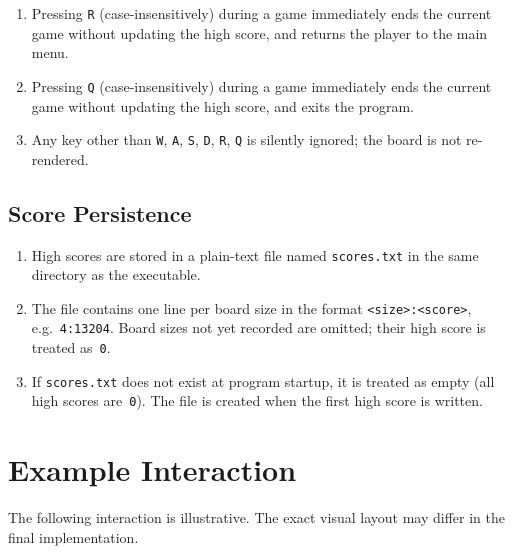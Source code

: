\documentclass{article} %
\newenvironment{myNote}{
        \begin{mdframed}[
                        style=defaultStyle,
                        linecolor=plGray,
                        backgroundcolor=plGray!8,
                        innertopmargin=7pt,
                        frametitle={\textbf{\color{plGray}Note}}
                ]
                \setlength{\parindent}{0pt}
                \setlength{\parskip}{5pt}
                }{
        \end{mdframed}
}
\begin{document}
\begin{enumerate}[resume]

	\item Pressing \texttt{R} (case-insensitively) during a game immediately ends the current game
	      without updating the high score, and returns the player to the main menu.

	\item Pressing \texttt{Q} (case-insensitively) during a game immediately ends the current game
	      without updating the high score, and exits the program.

	\item Any key other than \texttt{W}, \texttt{A}, \texttt{S}, \texttt{D}, \texttt{R}, \texttt{Q}
	      is silently ignored; the board is not re-rendered.

\end{enumerate}

\subsection{Score Persistence}

\begin{enumerate}[resume, label=\textbf{R\arabic*.}, leftmargin=*, itemsep=4pt]

	\item High scores are stored in a plain-text file named \texttt{scores.txt} in the same
	      directory as the executable.

	\item The file contains one line per board size in the format \texttt{<size>:<score>},
	      e.g.\ \texttt{4:13204}.
	      Board sizes not yet recorded are omitted; their high score is treated as~\texttt{0}.

	\item If \texttt{scores.txt} does not exist at program startup, it is treated as empty
	      (all high scores are~\texttt{0}).
	      The file is created when the first high score is written.

\end{enumerate}

\section{Example Interaction}

\begin{myNote}
	The following interaction is illustrative. The exact visual layout may differ in the final implementation.
\end{myNote}
\end{document}
